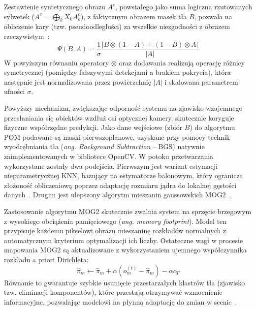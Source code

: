 Zestawienie syntetycznego obrazu $A^c$, powstałego jako suma logiczna rzutowanych sylwetek ($A^c =
  \bigoplus_k X_k A^c_k$), z faktycznym obrazem masek tła $B$, pozwala na obliczenie kary (tzw.
pseudoodległości) za wszelkie niezgodności z obrazem rzeczywistym~\cite{fleuret2008}:
\begin{equation}
  \Psi(B,A) = \frac{1}{\sigma} \frac{\big|B \otimes (1 - A) + (1 - B) \otimes A\big|}{|A|}
\end{equation}
W powyższym równaniu operatory $\otimes$ oraz dodawania realizują operację różnicy symetrycznej (pomiędzy fałszywymi detekcjami a brakiem pokrycia), która następnie jest normalizowana przez powierzchnię $|A|$ i skalowana parametrem ufności $\sigma$.

Powyższy mechanizm, zwiększając odporność systemu na zjawisko wzajemnego przesłaniania się obiektów
wzdłuż osi optycznej kamery, skutecznie koryguje fizyczne współrzędne predykcji. Jako dane
wejściowe (zbiór $B$) do algorytmu POM podawane są maski pierwszoplanowe, uzyskane przy pomocy
technik wyodrębniania tła (\textit{ang. Background Subtraction} -- BGS) natywnie zaimplementowanych
w bibliotece OpenCV. W potoku przetwarzania wykorzystane zostały dwa podejścia. Pierwszym jest
wariant estymacji nieparametrycznej KNN, bazujący na estymatorze balonowym, który ogranicza
złożoność obliczeniową poprzez adaptację rozmiaru jądra do lokalnej gęstości
danych~\cite{zivkovic2006}. Drugim jest ulepszony algorytm mieszanin gaussowskich
MOG2~\cite{zivkovic2004}.

Zastosowanie algorytmu MOG2 skutecznie zwalnia system na sprzęcie brzegowym z wysokiego obciążenia
pamięciowego (\textit{ang. memory footprint}). Model ten przypisuje każdemu pikselowi obrazu
mieszaninę rozkładów normalnych z automatycznym kryterium optymalizacji ich liczby. Ostateczne wagi
w procesie mapowania MOG2 są aktualizowane z wykorzystaniem ujemnego współczynnika rozkładu a
priori Dirichleta:
\begin{equation}
  \hat{\pi}_m \leftarrow \hat{\pi}_m + \alpha (o_m^{(t)} - \hat{\pi}_m) - \alpha c_T
\end{equation}
Równanie to gwarantuje szybkie usunięcie przestarzałych klastrów tła (zjawisko tzw. eliminacji komponentów), które przestają otrzymywać wzmocnienie informacyjne, pozwalając modelowi na płynną adaptację do zmian w scenie~\cite{zivkovic2004}.


